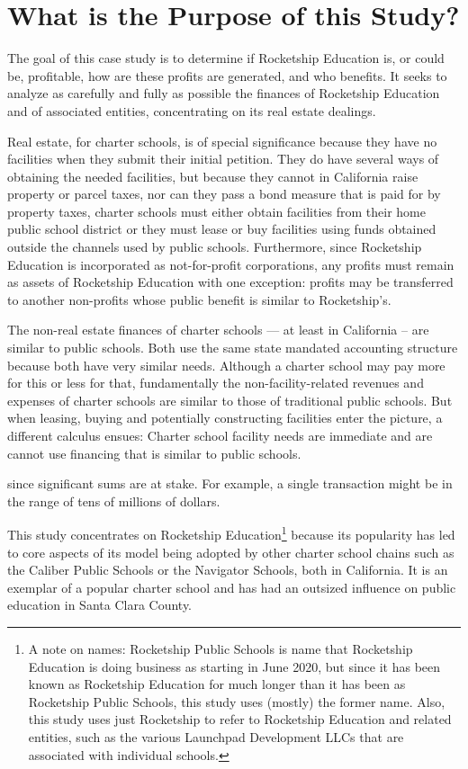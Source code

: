\section{What is the Purpose of this Study?}\indent

The goal of this case study is to determine if Rocketship Education is, or could be, profitable, how are these profits are generated, and who benefits. It seeks to analyze as carefully and fully as possible the finances of Rocketship Education and of associated entities, concentrating on its real estate dealings.

Real estate, for charter schools, is of special significance because they have no facilities when they submit their initial petition. They do have several ways of obtaining the needed facilities, but because they cannot in California raise property or parcel taxes, nor can they pass a bond measure that is paid for by property taxes, charter schools must either obtain facilities from their home public school district or they must lease or buy facilities using funds obtained outside the channels used by public schools. Furthermore, since Rocketship Education is incorporated as not-for-profit corporations, any profits must remain as assets of Rocketship Education with one exception: profits may be transferred to another non-profits whose public benefit is similar to Rocketship's.

The non-real estate finances of charter schools — at least in California – are similar to public schools. Both use the same state mandated accounting structure because both have very similar needs. Although a charter school may pay more for this or less for that, fundamentally the non-facility-related revenues and expenses of charter schools are similar to those of traditional public schools. But when leasing, buying and potentially constructing facilities enter the picture, a different calculus ensues: Charter school facility needs are immediate and are cannot use financing that is similar to public schools.

since significant sums are at stake. For example, a single transaction might be in the range of tens of millions of dollars.

This study concentrates on Rocketship Education\footnote{A note on names: Rocketship Public Schools is name that Rocketship Education is doing business as starting in June 2020, but since it has been known as Rocketship Education for much longer than it has been as Rocketship Public Schools, this study uses (mostly) the former name. Also, this study uses just Rocketship to refer to Rocketship Education and related entities, such as the various Launchpad Development LLCs that are associated with individual schools.} because its popularity has led to core aspects of its model being adopted by other charter school chains such as the Caliber Public Schools or the  Navigator Schools, both in California.  It is an exemplar of a popular charter school and has had an outsized influence on public education in Santa Clara County.

